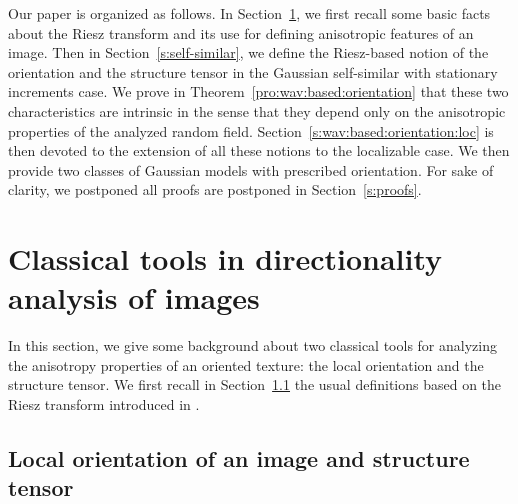 \documentclass{elsarticle}
\begin{document}
Our paper is organized as follows. In Section~\ref{s:riesz}, we first recall some basic facts about the Riesz transform and its use for defining anisotropic features of an image. Then in Section~\ref{s:self-similar}, we define the Riesz-based notion of the orientation and the structure tensor in the Gaussian self-similar with stationary increments case. We prove in Theorem~\ref{pro:wav:based:orientation} that these two characteristics are intrinsic in the sense that they depend only on the anisotropic properties of the analyzed random field. Section~\ref{s:wav:based:orientation:loc} is then devoted to the extension of all these notions to the localizable case. We then provide two classes of Gaussian models with prescribed orientation. For sake of clarity, we postponed all proofs are postponed in Section~\ref{s:proofs}.

\section{Classical tools in directionality analysis of images}\label{s:riesz}
%
In this section, we give some background about two classical tools for analyzing  the anisotropy properties of an oriented texture: the local orientation and the structure tensor. We first recall in Section~\ref{s:local-orientation} the usual definitions based on the Riesz transform introduced in \cite{FS01}. %

\subsection{Local orientation of an image and structure tensor\\}\label{s:local-orientation}
\end{document}
